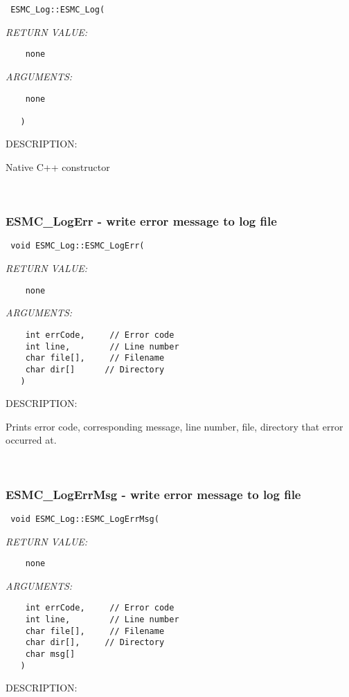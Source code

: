   
\begin{verbatim} 
 ESMC_Log::ESMC_Log(
 \end{verbatim}{\em RETURN VALUE:}
\begin{verbatim}    none\end{verbatim}{\em ARGUMENTS:}
\begin{verbatim}    none
 
   )
 \end{verbatim}
{\sf DESCRIPTION:\\ }


     Native C++ constructor 
 
\mbox{}\hrulefill\ 
 
\subsubsection [ESMC\_LogErr] {ESMC\_LogErr - write error message to log file}


  
\begin{verbatim} 
 void ESMC_Log::ESMC_LogErr(
 \end{verbatim}{\em RETURN VALUE:}
\begin{verbatim}    none\end{verbatim}{\em ARGUMENTS:}
\begin{verbatim} 
    int errCode,     // Error code
    int line,        // Line number
    char file[],     // Filename
    char dir[]      // Directory
   )\end{verbatim}
{\sf DESCRIPTION:\\ }


   Prints error code, corresponding message, line number, file, directory
   that error occurred at.  
 
\mbox{}\hrulefill\ 
 
\subsubsection [ESMC\_LogErrMsg] {ESMC\_LogErrMsg - write error message to log file}


  
\begin{verbatim} 
 void ESMC_Log::ESMC_LogErrMsg(
 \end{verbatim}{\em RETURN VALUE:}
\begin{verbatim}    none\end{verbatim}{\em ARGUMENTS:}
\begin{verbatim} 
    int errCode,     // Error code
    int line,        // Line number
    char file[],     // Filename
    char dir[],     // Directory
    char msg[]
   )\end{verbatim}
{\sf DESCRIPTION:\\ }


